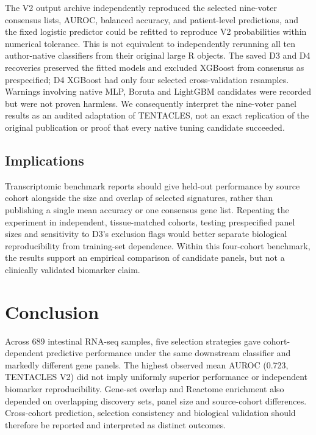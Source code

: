 The V2 output archive independently reproduced the selected nine-voter consensus lists, AUROC, balanced accuracy, and patient-level predictions, and the fixed logistic predictor could be refitted to reproduce V2 probabilities within numerical tolerance. This is not equivalent to independently rerunning all ten author-native classifiers from their original large R objects. The saved D3 and D4 recoveries preserved the fitted models and excluded XGBoost from consensus as prespecified; D4 XGBoost had only four selected cross-validation resamples. Warnings involving native MLP, Boruta and LightGBM candidates were recorded but were not proven harmless. We consequently interpret the nine-voter panel results as an audited adaptation of TENTACLES, not an exact replication of the original publication or proof that every native tuning candidate succeeded.

\subsection{Implications}
\label{sec:discussion_implications}
Transcriptomic benchmark reports should give held-out performance by source cohort alongside the size and overlap of selected signatures, rather than publishing a single mean accuracy or one consensus gene list. Repeating the experiment in independent, tissue-matched cohorts, testing prespecified panel sizes and sensitivity to D3's exclusion flags would better separate biological reproducibility from training-set dependence. Within this four-cohort benchmark, the results support an empirical comparison of candidate panels, but not a clinically validated biomarker claim.

\section{Conclusion}
\label{sec:conclusion}
Across 689 intestinal RNA-seq samples, five selection strategies gave cohort-dependent predictive performance under the same downstream classifier and markedly different gene panels. The highest observed mean AUROC (0.723, TENTACLES V2) did not imply uniformly superior performance or independent biomarker reproducibility. Gene-set overlap and Reactome enrichment also depended on overlapping discovery sets, panel size and source-cohort differences. Cross-cohort prediction, selection consistency and biological validation should therefore be reported and interpreted as distinct outcomes.
